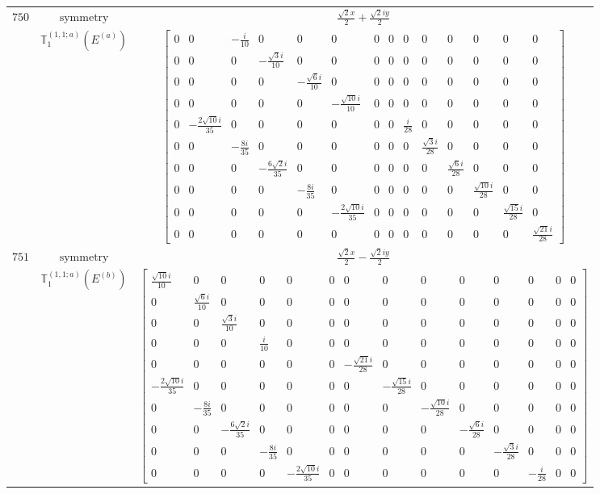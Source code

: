 \documentclass[fleqn,8pt,landscape]{jsarticle}
\begin{document}
\begin{longtable}{ccc}
$ 750 $ & $ \text{symmetry} $ & $ \frac{\sqrt{2} x}{2} + \frac{\sqrt{2} i y}{2} $ \\
$  $ & $ \mathbb{T}_{1}^{(1,1;a)}(E^{(a)}) $ & $ \begin{bmatrix} 0 & 0 & - \frac{i}{10} & 0 & 0 & 0 & 0 & 0 & 0 & 0 & 0 & 0 & 0 & 0 \\ 0 & 0 & 0 & - \frac{\sqrt{3} i}{10} & 0 & 0 & 0 & 0 & 0 & 0 & 0 & 0 & 0 & 0 \\ 0 & 0 & 0 & 0 & - \frac{\sqrt{6} i}{10} & 0 & 0 & 0 & 0 & 0 & 0 & 0 & 0 & 0 \\ 0 & 0 & 0 & 0 & 0 & - \frac{\sqrt{10} i}{10} & 0 & 0 & 0 & 0 & 0 & 0 & 0 & 0 \\ 0 & - \frac{2 \sqrt{10} i}{35} & 0 & 0 & 0 & 0 & 0 & 0 & \frac{i}{28} & 0 & 0 & 0 & 0 & 0 \\ 0 & 0 & - \frac{8 i}{35} & 0 & 0 & 0 & 0 & 0 & 0 & \frac{\sqrt{3} i}{28} & 0 & 0 & 0 & 0 \\ 0 & 0 & 0 & - \frac{6 \sqrt{2} i}{35} & 0 & 0 & 0 & 0 & 0 & 0 & \frac{\sqrt{6} i}{28} & 0 & 0 & 0 \\ 0 & 0 & 0 & 0 & - \frac{8 i}{35} & 0 & 0 & 0 & 0 & 0 & 0 & \frac{\sqrt{10} i}{28} & 0 & 0 \\ 0 & 0 & 0 & 0 & 0 & - \frac{2 \sqrt{10} i}{35} & 0 & 0 & 0 & 0 & 0 & 0 & \frac{\sqrt{15} i}{28} & 0 \\ 0 & 0 & 0 & 0 & 0 & 0 & 0 & 0 & 0 & 0 & 0 & 0 & 0 & \frac{\sqrt{21} i}{28} \end{bmatrix} $ \\ \hline
$ 751 $ & $ \text{symmetry} $ & $ \frac{\sqrt{2} x}{2} - \frac{\sqrt{2} i y}{2} $ \\
$  $ & $ \mathbb{T}_{1}^{(1,1;a)}(E^{(b)}) $ & $ \begin{bmatrix} \frac{\sqrt{10} i}{10} & 0 & 0 & 0 & 0 & 0 & 0 & 0 & 0 & 0 & 0 & 0 & 0 & 0 \\ 0 & \frac{\sqrt{6} i}{10} & 0 & 0 & 0 & 0 & 0 & 0 & 0 & 0 & 0 & 0 & 0 & 0 \\ 0 & 0 & \frac{\sqrt{3} i}{10} & 0 & 0 & 0 & 0 & 0 & 0 & 0 & 0 & 0 & 0 & 0 \\ 0 & 0 & 0 & \frac{i}{10} & 0 & 0 & 0 & 0 & 0 & 0 & 0 & 0 & 0 & 0 \\ 0 & 0 & 0 & 0 & 0 & 0 & - \frac{\sqrt{21} i}{28} & 0 & 0 & 0 & 0 & 0 & 0 & 0 \\ - \frac{2 \sqrt{10} i}{35} & 0 & 0 & 0 & 0 & 0 & 0 & - \frac{\sqrt{15} i}{28} & 0 & 0 & 0 & 0 & 0 & 0 \\ 0 & - \frac{8 i}{35} & 0 & 0 & 0 & 0 & 0 & 0 & - \frac{\sqrt{10} i}{28} & 0 & 0 & 0 & 0 & 0 \\ 0 & 0 & - \frac{6 \sqrt{2} i}{35} & 0 & 0 & 0 & 0 & 0 & 0 & - \frac{\sqrt{6} i}{28} & 0 & 0 & 0 & 0 \\ 0 & 0 & 0 & - \frac{8 i}{35} & 0 & 0 & 0 & 0 & 0 & 0 & - \frac{\sqrt{3} i}{28} & 0 & 0 & 0 \\ 0 & 0 & 0 & 0 & - \frac{2 \sqrt{10} i}{35} & 0 & 0 & 0 & 0 & 0 & 0 & - \frac{i}{28} & 0 & 0 \end{bmatrix} $ \\ \hline

\end{longtable}
\end{document}
